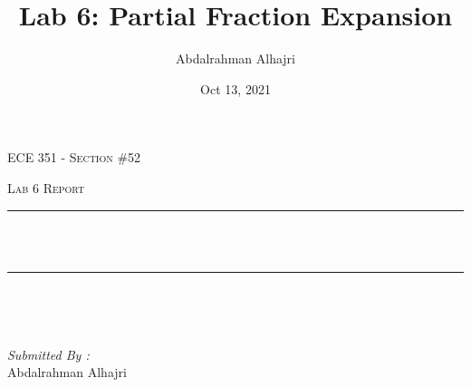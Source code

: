 \documentclass[12pt]{report}
\title{Lab 6: Partial Fraction Expansion}
\author{ Abdalrahman Alhajri}
\date{Oct 13, 2021}
\makeatletter
\let\thetitle\@title
\makeatother
\begin{document}

\begin{titlepage}
	\centering
    \vspace*{0.5 cm}
\begin{center}    \textsc{\Large   ECE 351 - Section \#52 }\\[2.0 cm]	\end{center}%
	\textsc{\Large Lab 6 Report }\\[0.5 cm]				%
	\rule{\linewidth}{0.2 mm} \\[0.4 cm]
	{ \huge \bfseries \thetitle}\\
	\rule{\linewidth}{0.2 mm} \\[1.5 cm]
	
	\begin{minipage}{0.4\textwidth}
		\begin{flushleft} \large
			\end{flushleft}
			\end{minipage}~
			\begin{minipage}{0.4\textwidth}
            
			\begin{flushright} \large
			\emph{Submitted By :} \\
			Abdalrahman Alhajri 
		\end{flushright}
           
	\end{minipage}\\[2 cm]
	
    
    
    
    
	
\end{titlepage}


\tableofcontents
\pagebreak

\renewcommand{\thesection}{\arabic{section}}
\end{document}
